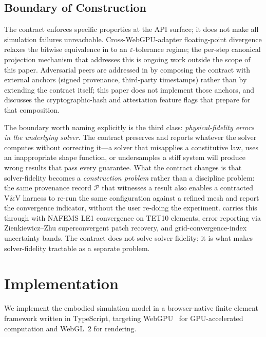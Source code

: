 \documentclass[journal]{IEEEtran}
\begin{document}
\subsection{Boundary of Construction}
\label{sec:model:boundary}

The contract enforces specific properties at the API surface; it does
not make all simulation failures unreachable. Cross-WebGPU-adapter
floating-point divergence relaxes the bitwise equivalence in
 to an $\varepsilon$-tolerance regime; the per-step
canonical projection mechanism that addresses this is ongoing work
outside the scope of this paper. Adversarial peers are addressed in
 by composing the contract with external
anchors (signed provenance, third-party timestamps) rather than by
extending the contract itself; this paper does not implement those
anchors, and  discusses the
cryptographic-hash and attestation feature flags that prepare for that
composition.

The boundary worth naming explicitly is the third class:
\emph{physical-fidelity errors in the underlying solver}. The contract
preserves and reports whatever the solver computes without correcting
it---a solver that misapplies a constitutive law, uses an inappropriate
shape function, or undersamples a stiff system will produce wrong
results that pass every guarantee. What the contract changes is that
solver-fidelity becomes a \emph{construction problem} rather than a
discipline problem: the same provenance record $\mathcal{P}$ that
witnesses a result also enables a contracted V\&V harness to re-run
the same configuration against a refined mesh and report the
convergence indicator, without the user re-doing the experiment.
 carries this through with NAFEMS LE1 convergence
on TET10 elements, error reporting via Zienkiewicz--Zhu superconvergent
patch recovery, and grid-convergence-index uncertainty bands. The
contract does not solve solver fidelity; it is what makes
solver-fidelity tractable as a separate problem.


\section{Implementation}
\label{sec:implementation}

We implement the embodied simulation model in a browser-native finite
element framework written in TypeScript, targeting WebGPU~\cite{WebGPUSpec}
for GPU-accelerated computation and WebGL~2 for rendering.
\end{document}
